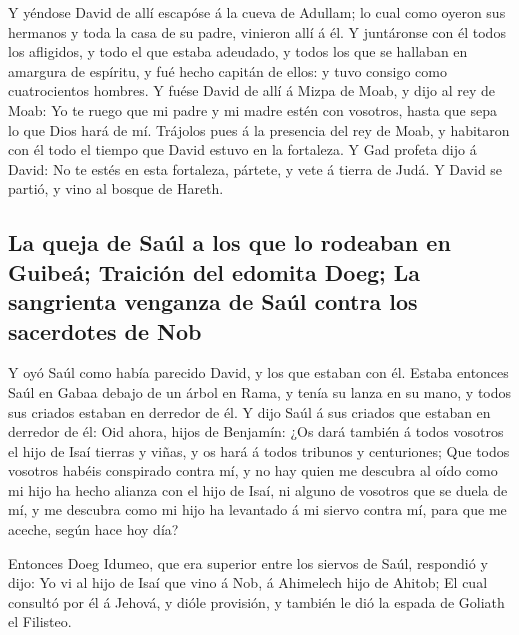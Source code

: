  Y yéndose David de allí escapóse á la cueva de Adullam;
lo cual como oyeron sus hermanos y toda la casa de su padre, vinieron
allí á él.  Y juntáronse con él todos los afligidos, y
todo el que estaba adeudado, y todos los que se hallaban en amargura de
espíritu, y fué hecho capitán de ellos: y tuvo consigo como
cuatrocientos hombres.  Y fuése David de allí á Mizpa de
Moab, y dijo al rey de Moab: Yo te ruego que mi padre y mi madre estén
con vosotros, hasta que sepa lo que Dios hará de mí. 
Trájolos pues á la presencia del rey de Moab, y habitaron con él todo el
tiempo que David estuvo en la fortaleza.  Y Gad profeta
dijo á David: No te estés en esta fortaleza, pártete, y vete á tierra de
Judá. Y David se partió, y vino al bosque de Hareth.

\hypertarget{la-queja-de-sauxfal-a-los-que-lo-rodeaban-en-guibeuxe1-traiciuxf3n-del-edomita-doeg-la-sangrienta-venganza-de-sauxfal-contra-los-sacerdotes-de-nob}{%
\subsection{La queja de Saúl a los que lo rodeaban en Guibeá; Traición
del edomita Doeg; La sangrienta venganza de Saúl contra los sacerdotes
de
Nob}\label{la-queja-de-sauxfal-a-los-que-lo-rodeaban-en-guibeuxe1-traiciuxf3n-del-edomita-doeg-la-sangrienta-venganza-de-sauxfal-contra-los-sacerdotes-de-nob}}

 Y oyó Saúl como había parecido David, y los que estaban
con él. Estaba entonces Saúl en Gabaa debajo de un árbol en Rama, y
tenía su lanza en su mano, y todos sus criados estaban en derredor de
él.  Y dijo Saúl á sus criados que estaban en derredor de
él: Oid ahora, hijos de Benjamín: ¿Os dará también á todos vosotros el
hijo de Isaí tierras y viñas, y os hará á todos tribunos y centuriones;
 Que todos vosotros habéis conspirado contra mí, y no hay
quien me descubra al oído como mi hijo ha hecho alianza con el hijo de
Isaí, ni alguno de vosotros que se duela de mí, y me descubra como mi
hijo ha levantado á mi siervo contra mí, para que me aceche, según hace
hoy día?

 Entonces Doeg Idumeo, que era superior entre los siervos
de Saúl, respondió y dijo: Yo vi al hijo de Isaí que vino á Nob, á
Ahimelech hijo de Ahitob;  El cual consultó por él á
Jehová, y dióle provisión, y también le dió la espada de Goliath el
Filisteo.

